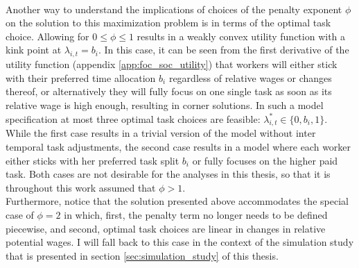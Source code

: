 \documentclass[../main.tex]{subfiles}
\begin{document}
\\
Another way to understand the implications of choices of the penalty exponent $\phi$ on the solution to this maximization problem is in terms of the optimal task choice. Allowing for $0 \leq \phi \leq 1$ results in a weakly convex utility function with a kink point at $\lambda_{i,t} = b_i$. In this case, it can be seen from the first derivative of the utility function (appendix \ref{app:foc_soc_utility}) that workers will either stick with their preferred time allocation $b_i$ regardless of relative wages or changes thereof, or alternatively they will fully focus on one single task as soon as its relative wage is high enough, resulting in corner solutions. In such a model specification at most three optimal task choices are feasible: $\lambda_{i,t}^* \in \{0, b_i, 1\}$. While the first case results in a trivial version of the model without inter temporal task adjustments, the second case results in a model where each worker either sticks with her preferred task split $b_i$ or fully focuses on the higher paid task. Both cases are not desirable for the analyses in this thesis, so that it is throughout this work assumed that $\phi > 1$.
\\
Furthermore, notice that the solution presented above accommodates the special case of $\phi = 2$ in which, first, the penalty term no longer needs to be defined piecewise, and second, optimal task choices are linear in changes in relative potential wages. I will fall back to this case in the context of the simulation study that is presented in section \ref{sec:simulation_study} of this thesis.
\end{document}
